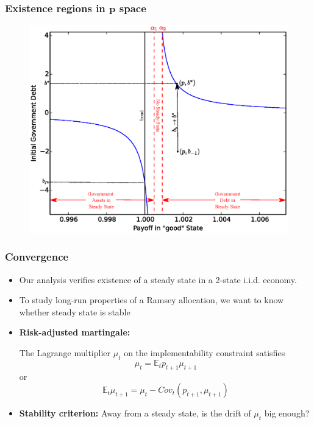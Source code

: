 \documentclass{beamer}
\newcommand{\EE}{\mathbb E}
\begin{document}
\begin{frame}
   \frametitle{Existence regions in $\bm{p}$ space}
	\begin{figure}
		\begin{center}
		\includegraphics[scale=.5]{Images/graph_nostable.eps}
	\end{center}	
	\end{figure}

  \end{frame}


 \begin{frame}
  \frametitle{Convergence}
  \begin{itemize}
		\item Our analysis verifies existence of a steady state in a 2-state i.i.d. economy.
		\item To study long-run properties of a Ramsey allocation, we want to know whether steady state is stable
		\item \textbf{Risk-adjusted martingale:}
		
		The Lagrange multiplier $\mu_t$ on the implementability  constraint   satisfies
		\[
			\mu_t = \EE_t p_{t+1} \mu_{t+1}
		\] or
		\[
		\EE_t  \mu_{t+1}	= \mu_t -Cov_t (p_{t+1}, \mu_{t+1})
		\]
	
		\item \textbf{Stability criterion: }   Away from a steady state, is the drift  of $\mu_t$ big enough?
		\end{itemize}
	

  \end{frame}
\end{document}
